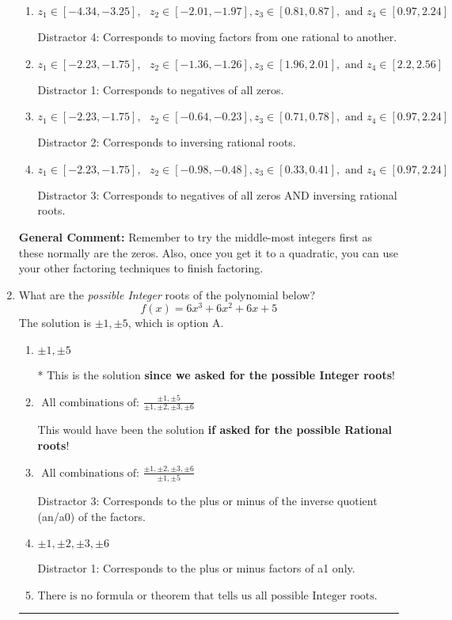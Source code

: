 \documentclass{extbook}[14pt]
\newcommand{\litem}[1]{\item #1

\rule{\textwidth}{0.4pt}}
\begin{document}
\begin{enumerate}
{\begin{enumerate}[label=\Alph*.]
* This is the solution!
\item \( z_1 \in [-4.34, -3.25], \text{   }  z_2 \in [-2.01, -1.97], z_3 \in [0.81, 0.87], \text{   and   } z_4 \in [0.97, 2.24] \)

 Distractor 4: Corresponds to moving factors from one rational to another.
\item \( z_1 \in [-2.23, -1.75], \text{   }  z_2 \in [-1.36, -1.26], z_3 \in [1.96, 2.01], \text{   and   } z_4 \in [2.2, 2.56] \)

 Distractor 1: Corresponds to negatives of all zeros.
\item \( z_1 \in [-2.23, -1.75], \text{   }  z_2 \in [-0.64, -0.23], z_3 \in [0.71, 0.78], \text{   and   } z_4 \in [0.97, 2.24] \)

 Distractor 2: Corresponds to inversing rational roots.
\item \( z_1 \in [-2.23, -1.75], \text{   }  z_2 \in [-0.98, -0.48], z_3 \in [0.33, 0.41], \text{   and   } z_4 \in [0.97, 2.24] \)

 Distractor 3: Corresponds to negatives of all zeros AND inversing rational roots.
\end{enumerate}

\textbf{General Comment:} Remember to try the middle-most integers first as these normally are the zeros. Also, once you get it to a quadratic, you can use your other factoring techniques to finish factoring.
}
\litem{
What are the \textit{possible Integer} roots of the polynomial below?
\[ f(x) = 6x^{3} +6 x^{2} +6 x + 5 \]The solution is \( \pm 1,\pm 5 \), which is option A.\begin{enumerate}[label=\Alph*.]
\item \( \pm 1,\pm 5 \)

* This is the solution \textbf{since we asked for the possible Integer roots}!
\item \( \text{ All combinations of: }\frac{\pm 1,\pm 5}{\pm 1,\pm 2,\pm 3,\pm 6} \)

This would have been the solution \textbf{if asked for the possible Rational roots}!
\item \( \text{ All combinations of: }\frac{\pm 1,\pm 2,\pm 3,\pm 6}{\pm 1,\pm 5} \)

 Distractor 3: Corresponds to the plus or minus of the inverse quotient (an/a0) of the factors. 
\item \( \pm 1,\pm 2,\pm 3,\pm 6 \)

 Distractor 1: Corresponds to the plus or minus factors of a1 only.
\item \( \text{There is no formula or theorem that tells us all possible Integer roots.} \)


\end{enumerate}}
\end{enumerate}
\end{document}
